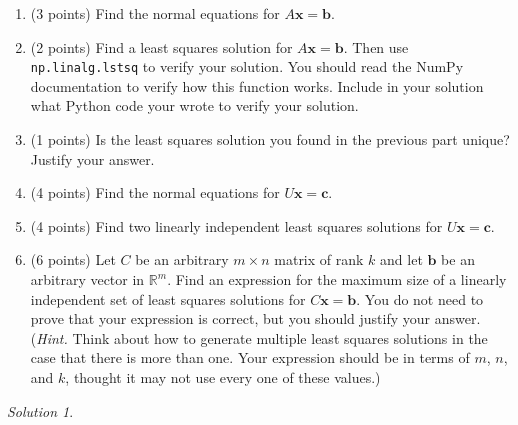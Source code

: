 \documentclass{article}
\theoremstyle{remark}
\newtheorem*{solution}{Solution}
\newcommand{\vv}[1]{\mathbf{#1}}
\newcommand{\R}{\mathbb R}
\begin{document}
\begin{enumerate}
\item (3 points) Find the normal equations for $A\vv x = \vv b$.
\item (2 points) Find a least squares solution for $A \vv x = \vv b$. Then use \texttt{np.linalg.lstsq} to verify your solution. You should read the NumPy documentation to verify how this function works. Include in your solution what Python code your wrote to verify your solution.
\item (1 points) Is the least squares solution you found in the previous part unique? Justify your answer.
\item (4 points) Find the normal equations for $U\vv x = \vv c$.
\item (4 points) Find two linearly independent least squares solutions for $U\vv x = \vv c$.
\item (6 points) Let $C$ be an arbitrary $m \times n$ matrix of rank $k$ and let $\mathbf b$ be an arbitrary vector in $\R^m$.
  Find an expression for the maximum size of a linearly independent set of least squares solutions for $C\mathbf x = \mathbf b$.
  You do not need to prove that your expression is correct, but you should justify your answer.
  (\textit{Hint.} Think about how to generate multiple least squares solutions in the case that there is more than one. Your expression should be in terms of $m$, $n$, and $k$, thought it may not use every one of these values.)
\end{enumerate}
\medskip

\begin{solution}
\end{solution}
\end{document}

